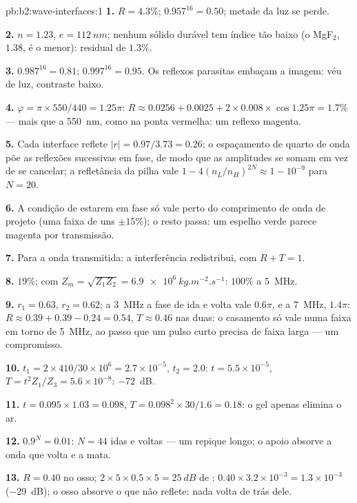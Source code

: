 \begin{solution}{pb:b2:wave-interfaces:1}
\textbf{1.} $R = 4.3\%$; $0.957^{16} = 0.50$; metade da luz se perde.

\textbf{2.} $n = 1.23$, $e = \qty{112}{nm}$; nenhum sólido durável tem índice
tão baixo (o MgF$_2$, $1.38$, é o menor): residual de $1.3\%$.

\textbf{3.} $0.987^{16} = 0.81$; $0.997^{16} = 0.95$. Os reflexos parasitas embaçam a
imagem: véu de luz, contraste baixo.

\textbf{4.} $\varphi = \pi \times 550/440 = 1.25\pi$: $R \approx 0.0256 + 0.0025 + 2 \times 0.008 \times
\cos1.25\pi = 1.7\%$ --- mais que a \qty{550}{nm}, como na ponta vermelha: um
reflexo magenta.

\textbf{5.} Cada interface reflete $|r| = 0.97/3.73 = 0.26$; o espaçamento de
quarto de onda põe as reflexões sucessivas em fase, de modo que as amplitudes se somam
em vez de se cancelar; a refletância da pilha vale $1 - 4(n_L/n_H)^{2N}
\approx 1 - 10^{-9}$ para $N = 20$.

\textbf{6.} A condição de estarem em fase só vale perto do comprimento de onda
de projeto (uma faixa de uns $\pm15\%$); o resto passa: um espelho verde
parece magenta por transmissão.

\textbf{7.} Para a onda transmitida: a interferência redistribui, com
$R + T = 1$.

\textbf{8.} $19\%$; com $Z_m = \sqrt{Z_1Z_2} = \qty{6.9e6}{kg.m^{-2}.s^{-1}}$: $100\%$ a
\qty{5}{MHz}.

\textbf{9.} $r_1 = 0.63$, $r_2 = 0.62$; a \qty{3}{MHz} a fase de ida e volta vale
$0.6\pi$, e a \qty{7}{MHz}, $1.4\pi$: $R \approx 0.39 + 0.39 - 0.24 = 0.54$, $T \approx 0.46$
nas duas: o casamento só vale numa faixa em torno de \qty{5}{MHz}, ao passo que um
pulso curto precisa de faixa larga --- um compromisso.

\textbf{10.} $t_1 = 2 \times 410/30 \times 10^6 = 2.7 \times 10^{-5}$, $t_2 = 2.0$: $t = 5.5 \times 10^{-5}$,
$T = t^2Z_1/Z_3 = 5.6 \times 10^{-8}$: \qty{-72}{dB}.

\textbf{11.} $t = 0.095 \times 1.03 = 0.098$, $T = 0.098^2 \times 30/1.6 = 0.18$: o gel
apenas elimina o ar.

\textbf{12.} $0.9^N = 0.01$: $N = 44$ idas e voltas --- um repique longo; o
apoio absorve a onda que volta e a mata.

\textbf{13.} $R = 0.40$ no osso; $2 \times 5 \times 0.5 \times 5 = \qty{25}{dB}$ de
: $0.40 \times 3.2 \times 10^{-3} = 1.3 \times 10^{-3}$ (\qty{-29}{dB}); o osso
absorve o que não reflete: nada volta de trás dele.


\end{solution}
